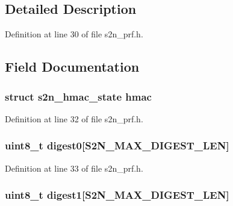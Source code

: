 \subsection{Detailed Description}


Definition at line 30 of file s2n\+\_\+prf.\+h.



\subsection{Field Documentation}
\subsubsection[{\texorpdfstring{hmac}{hmac}}]{\setlength{\rightskip}{0pt plus 5cm}struct {\bf s2n\+\_\+hmac\+\_\+state} hmac}\hypertarget{unions2n__prf__working__space_ab670d77ffcc4e14502b41811d2385dc9}{}\label{unions2n__prf__working__space_ab670d77ffcc4e14502b41811d2385dc9}


Definition at line 32 of file s2n\+\_\+prf.\+h.

\subsubsection[{\texorpdfstring{digest0}{digest0}}]{\setlength{\rightskip}{0pt plus 5cm}uint8\+\_\+t digest0\mbox{[}{\bf S2\+N\+\_\+\+M\+A\+X\+\_\+\+D\+I\+G\+E\+S\+T\+\_\+\+L\+EN}\mbox{]}}\hypertarget{unions2n__prf__working__space_a16b7ee508a903d1d994b21e2e501145a}{}\label{unions2n__prf__working__space_a16b7ee508a903d1d994b21e2e501145a}


Definition at line 33 of file s2n\+\_\+prf.\+h.

\subsubsection[{\texorpdfstring{digest1}{digest1}}]{\setlength{\rightskip}{0pt plus 5cm}uint8\+\_\+t digest1\mbox{[}{\bf S2\+N\+\_\+\+M\+A\+X\+\_\+\+D\+I\+G\+E\+S\+T\+\_\+\+L\+EN}\mbox{]}}\hypertarget{unions2n__prf__working__space_a92a247fdaf3682c6128d6b5efbcf0c9c}{}\label{unions2n__prf__working__space_a92a247fdaf3682c6128d6b5efbcf0c9c}


